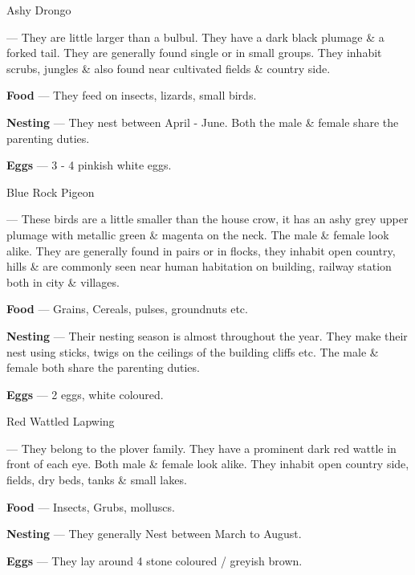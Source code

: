 \begin{bird}{Ashy Drongo}

 --- They are little larger than a bulbul. They have a dark black plumage \& a forked tail. They are generally found single or in small groups. They inhabit scrubs, jungles \& also found near cultivated fields \& country side.

{\large\bf Food} --- They feed on insects, lizards, small birds.

{\large\bf Nesting} --- They nest between April - June. Both the male \& female share the parenting duties.

{\large\bf Eggs} --- 3 - 4 pinkish white eggs.
\end{bird}

\newpage

\begin{bird}{Blue Rock Pigeon}

 --- These birds are a little smaller than the house crow, it has an ashy grey upper plumage with metallic green \& magenta on the neck. The male \& female look alike. They are generally found in pairs or in flocks, they inhabit open country, hills \& are commonly seen near human habitation on building, railway station both in city \& villages.

{\large\bf Food} --- Grains, Cereals, pulses, groundnuts etc.

{\large\bf Nesting} --- Their nesting season is almost throughout the year. They make their nest using sticks, twigs on the ceilings of the building cliffs etc. The male \& female both share the parenting duties.

{\large\bf Eggs} --- 2 eggs, white coloured.
\end{bird}

\begin{bird}{Red Wattled Lapwing}

 --- They belong to the plover family. They have a prominent dark red wattle in front of each eye. Both male \& female look alike. They inhabit open country side, fields, dry beds, tanks \& small lakes.

{\large\bf Food} --- Insects, Grubs, molluscs.

{\large\bf Nesting} --- They generally Nest between March to August.

{\large\bf Eggs} --- They lay around 4 stone coloured / greyish brown.
\end{bird}

